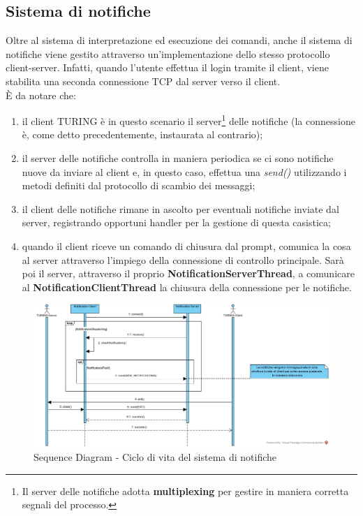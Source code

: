 \subsection{Sistema di notifiche}
Oltre al sistema di interpretazione ed esecuzione dei comandi, anche il sistema di notifiche viene gestito attraverso un'implementazione dello stesso protocollo client-server. Infatti, quando l'utente effettua il login tramite il client, viene stabilita una seconda connessione TCP dal server verso il client.\\ È da notare che:
\begin{enumerate}
	\item il client TURING è in questo scenario il server\footnote{Il server delle notifiche adotta \textbf{multiplexing} per gestire in maniera corretta segnali del processo.} delle notifiche (la connessione è, come detto precedentemente, instaurata al contrario);
	\item il server delle notifiche controlla in maniera periodica se ci sono notifiche nuove da inviare al client e, in questo caso, effettua una \textit{send()} utilizzando i metodi definiti dal protocollo di scambio dei messaggi;
	\item il client delle notifiche rimane in ascolto per eventuali notifiche inviate dal server, registrando opportuni handler per la gestione di questa casistica;
	\item quando il client riceve un comando di chiusura dal prompt, comunica la cosa al server attraverso l'impiego della connessione di controllo principale. Sarà poi il server, attraverso il proprio \textbf{NotificationServerThread}, a comunicare al \textbf{NotificationClientThread} la chiusura della connessione per le notifiche.
\end{enumerate}

\begin{figure}[h]
	\caption{Sequence Diagram - Ciclo di vita del sistema di notifiche }
	\includegraphics[scale=0.4]{assets/notification_lifec-ycle}
\end{figure}